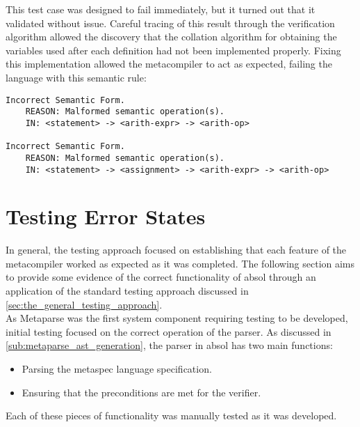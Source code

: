 This test case was designed to fail immediately, but it turned out that it validated without issue. 
Careful tracing of this result through the verification algorithm allowed the discovery that the collation algorithm for obtaining the variables used after each definition had not been implemented properly. 
Fixing this implementation allowed the metacompiler to act as expected, failing the language with this semantic rule:

\begin{verbatim}
Incorrect Semantic Form.
    REASON: Malformed semantic operation(s).
    IN: <statement> -> <arith-expr> -> <arith-op>

Incorrect Semantic Form.
    REASON: Malformed semantic operation(s).
    IN: <statement> -> <assignment> -> <arith-expr> -> <arith-op>
\end{verbatim}



\section{Testing Error States} %
\label{sec:testing_error_states}
In general, the testing approach focused on establishing that each feature of the metacompiler worked as expected as it was completed. 
The following section aims to provide some evidence of the correct functionality of \gls{absol} through an application of the standard testing approach discussed in \autoref{sec:the_general_testing_approach}. \\

As Metaparse was the first system component requiring testing to be developed, initial testing focused on the correct operation of the parser.
As discussed in \autoref{sub:metaparse_ast_generation}, the parser in \gls{absol} has two main functions:
\begin{itemize}
    \item Parsing the \gls{metaspec} language specification.
    \item Ensuring that the preconditions are met for the verifier.
\end{itemize}

Each of these pieces of functionality was manually tested as it was developed. 

